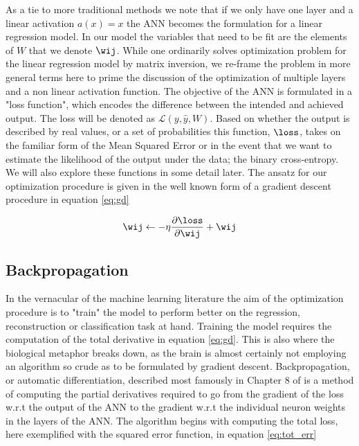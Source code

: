 \noindent As a tie to more traditional methods we note that if we only have one layer and a linear activation $a(x) = x$ the ANN becomes the formulation for a linear regression model. In our model the variables that need to be fit are the elements of $W$ that we denote $\wij$. While one ordinarily solves optimization problem for the linear regression model by matrix inversion, we re-frame the problem in more general terms here to prime the discussion of the optimization of multiple layers and a non linear activation function. The objective of the ANN is formulated in a "loss function", which encodes the difference between the intended and achieved output. The loss will be denoted as $\mathcal{L}(y, \hat{y}, W)$. Based on whether the output is described by real values, or a set of probabilities this function, $\loss$, takes on the familiar form of the Mean Squared Error or in the event that we want to estimate the likelihood of the output under the data; the binary cross-entropy. We will also explore these functions in some detail later. The ansatz for our optimization procedure is given in the well known form of a gradient descent procedure in equation \ref{eq:gd}

\begin{equation}\label{eq:gd}
	\wij \leftarrow -\eta \frac{\partial \loss}{\partial \wij} + \wij 
\end{equation}

\subsection{Backpropagation}

In the vernacular of the machine learning literature the aim of the optimization procedure is to "train" the model to perform better on the regression, reconstruction or classification task at hand. Training the model requires the computation of the total derivative in equation \ref{eq:gd}. This is also where the biological metaphor breaks down, as the brain is almost certainly not employing an algorithm so crude as to be formulated by gradient descent. Backpropagation, or automatic differentiation, described most famously in Chapter 8 of \citet{Polk2002} is a method of computing the partial derivatives required to go from the gradient of the loss w.r.t the output of the ANN to the gradient w.r.t the individual neuron weights in the layers of the ANN. The algorithm begins with computing the total loss, here exemplified with the squared error function, in equation \ref{eq:tot_err}

